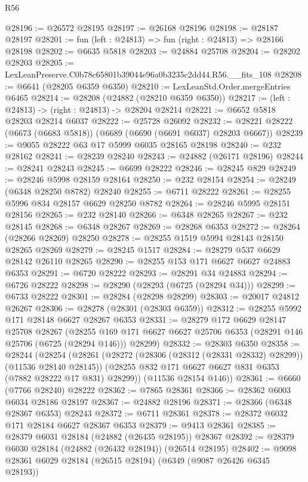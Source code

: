 \begin{lexlean}{R56}
\begin{coremodule}
@28196 := @26572 @28195
@28197 := @26168 @28196
@28198 := @28187 @28197
@28201 := fun (left : @24813) => fun (right : @24813) => @28166 @28198
@28202 := @6635 @5818
@28203 := @24884 @25708
@28204 := @28202 @28203
@28205 := LexLeanPreserve.C0b78c65801b39044e96a0b3235c2dd44.R56.__fits_108
@28208 := @6641 (@28205 @6359 @6350)
@28210 := LexLeanStd.Order.mergeEntries @6465
@28214 := @28208 (@24882 (@28210 @6359 @6350))
@28217 := (left : @24813) -> (right : @24813) -> @28204 @28214
@28221 := @6652 @5818 @28203 @28214 @6037
@28222 := @25728 @26092
@28232 := @28221 @28222 (@6673 (@6683 @5818)) (@6689 (@6690 (@6691 @6037) @28203 @6667))
@28239 := @9055 @28222 @63 @17 @5999 @6035 @28165 @28198
@28240 := @232 @28162
@28241 := @28239 @28240
@28243 := @24882 (@26171 @28196)
@28244 := @28241 @28243
@28245 := @6699 @28222
@28246 := @28245 @829
@28249 := @28246 @5998 @28159 @28164
@28250 := @232 @28154
@28254 := @28249 (@6348 @28250 @8782) @28240
@28255 := @6711 @28222
@28261 := @28255 @5996 @834 @28157 @6629 @28250 @8782
@28264 := @28246 @5995 @28151 @28156
@28265 := @232 @28140
@28266 := @6348 @28265
@28267 := @232 @28145
@28268 := @6348 @28267
@28269 := @28268 @6353
@28272 := @28264 (@28266 @28269) @28250
@28278 := @28255 @1519 @5994 @28143 @28150 @28265 @28269
@28279 := @28245 @1517
@28284 := @28279 @537 @6629 @28142 @26110 @28265
@28290 := @28255 @153 @171 @6627 @6627 @24883 @6353
@28291 := @6720 @28222
@28293 := @28291 @34 @24883
@28294 := @6726 @28222
@28298 := @28290 (@28293 (@6725 (@28294 @34)))
@28299 := @6733 @28222
@28301 := @28284 (@28298 @28299)
@28303 := @20017 @24812 @26267
@28306 := @28278 (@28301 (@28303 @6359))
@28312 := @28255 @5992 @171 @28148 @6627 @28267 @6353
@28331 := @28279
    @172
    @6629
    @28147
    @25708
    @28267
    (@28255 @169 @171 @6627 @6627 @25706 @6353 (@28291 @146 @25706 (@6725 (@28294 @146))) @28299)
@28332 := @28303 @6350
@28358 := @28244
    (@28254
      (@28261
        (@28272 (@28306 (@28312 (@28331 @28332) @28299)) (@11536 @28140 @28145))
        (@28255 @832 @171 @6627 @6627 @831 @6353 (@7882 @28222 @17 @831) @28299))
      (@11536 @28154 @146))
@28361 := @6660 (@7766 @28240) @28222
@28362 := @7865 @28361
@28366 := @28362 @6003 @6034 @28186 @28197
@28367 := @24882 @28196
@28371 := @28366 (@6348 @28367 @6353) @28243
@28372 := @6711 @28361
@28378 := @28372 @6032 @171 @28184 @6627 @28367 @6353
@28379 := @9413 @28361
@28385 := @28379 @6031 @28184 (@24882 (@26435 @28195)) @28367
@28392 := @28379 @6030 @28184 (@24882 (@26432 @28194)) (@26514 @28195)
@28402 := @9098 @28361 @6029 @28184 (@26515 @28194) (@6349 (@9087 @26426 @6345 @28193))

\end{coremodule}
\end{lexlean}
